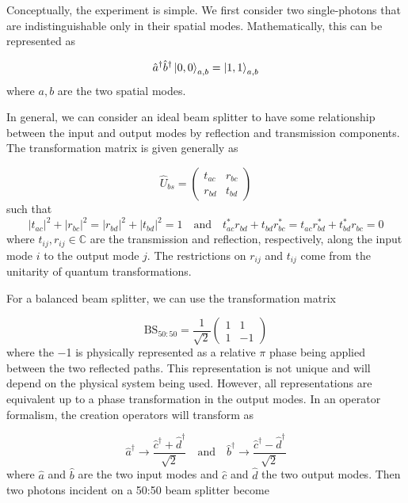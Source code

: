 Conceptually, the experiment is simple. We first consider two single-photons that are indistinguishable only in their spatial modes. Mathematically, this can be represented as 

\begin{equation}
	\hat{a}^\dagger \hat{b}^\dagger \ket{0,0}_{a,b} = \ket{1,1}_{a,b}
\end{equation}
where $a,b$ are the two spatial modes.

In general, we can consider an ideal beam splitter to have some relationship between the input and output modes by reflection and transmission components. The transformation matrix is given generally as 

\begin{equation}
	\hat{U}_{bs} = \left(
	\begin{matrix}
		t_{ac} & r_{bc} \\
		r_{bd} & t_{bd}
	\end{matrix}
	\right)
\end{equation}
such that
\begin{equation}
	|t_{ac}|^2 + |r_{bc}|^2 = |r_{bd}|^2 + |t_{bd}|^2 = 1 
	\quad\text{and}\quad
	t_{ac}^\ast r_{bd} + t_{bd} r_{bc}^\ast = t_{ac} r_{bd}^\ast + t_{bd}^\ast  r_{bc} = 0
\end{equation}
where $t_{ij}, r_{ij} \in \mathbb{C}$ are the transmission and reflection, respectively, along the input mode $i$ to the output mode $j$. The restrictions on $r_{ij}$ and $t_{ij}$ come from the unitarity of quantum transformations. 

For a balanced beam splitter,  we can use the transformation matrix

\begin{equation}
	\text{BS}_{50:50} = \frac{1}{\sqrt{2}}
	\left(
	\begin{matrix}
		1 & 1 \\
		1 & -1
	\end{matrix}
	\right)	
\end{equation}
where the \num{-1} is physically represented as a relative $\pi$ phase being applied between the two reflected paths. This representation is not unique and will depend on the physical system being used. However, all representations are equivalent up to a phase transformation in the output modes. In an operator formalism, the creation operators will transform as

\begin{equation}
	\hat{a}^\dagger \rightarrow \frac{\hat{c}^\dagger + \hat{d}^\dagger}{\sqrt{2}} \quad \text{and} \quad \hat{b}^\dagger \rightarrow \frac{\hat{c}^\dagger - \hat{d}^\dagger}{\sqrt{2}}
\end{equation}
where $\hat{a}$ and $\hat{b}$ are the two input modes and $\hat{c}$ and $\hat{d}$ the two output modes. Then two photons incident on a {50:50} beam splitter become

